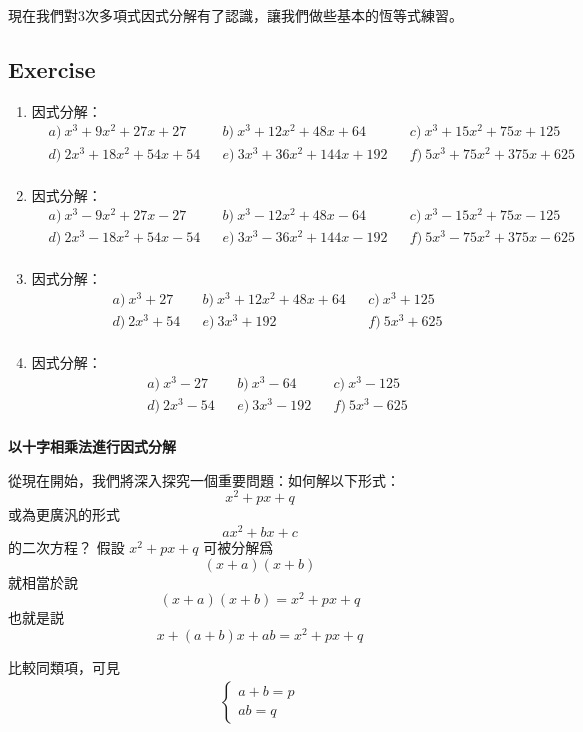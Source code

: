 \documentclass[12pt]{article}
\begin{document}
    現在我們對3次多項式因式分解有了認識，讓我們做些基本的恆等式練習。

    \subsection*{Exercise}
    \begin{enumerate}
        \item 因式分解：\begin{align*}
            &a)\ x^3+9x^2+27x+27&&b)\ x^3+12x^2+48x+64&&c)\ x^3+15x^2+75x+125\\
            &d)\ 2x^3+18x^2+54x+54&&e)\ 3x^3+36x^2+144x+192&&f)\ 5x^3+75x^2+375x+625\\
        \end{align*}
        \item 因式分解：\begin{align*}
            &a)\ x^3-9x^2+27x-27&&b)\ x^3-12x^2+48x-64&&c)\ x^3-15x^2+75x-125\\
            &d)\ 2x^3-18x^2+54x-54&&e)\ 3x^3-36x^2+144x-192&&f)\ 5x^3-75x^2+375x-625\\
        \end{align*}
        \item 因式分解：\begin{align*}
            &a)\ x^3+27&&b)\ x^3+12x^2+48x+64&&c)\ x^3+125\\
            &d)\ 2x^3+54&&e)\ 3x^3+192&&f)\ 5x^3+625\\
        \end{align*}
        \item 因式分解：\begin{align*}
            &a)\ x^3-27&&b)\ x^3-64&&c)\ x^3-125\\
            &d)\ 2x^3-54&&e)\ 3x^3-192&&f)\ 5x^3-625\\
        \end{align*}
    \end{enumerate}

    \begin{center}
        \textbf{以十字相乘法進行因式分解}
    \end{center}

    從現在開始，我們將深入探究一個重要問題：如何解以下形式： $$x^2+px+q$$ 或為更廣汎的形式 $$ax^2+bx+c$$ 的二次方程？ 假設 $x^2+px+q$ 可被分解爲 $$(x+a)(x+b)$$ 就相當於說 $$(x+a)(x+b)=x^2+px+q$$ 也就是説 $$x+(a+b)x+ab=x^2+px+q$$

    比較同類項，可見 \begin{align*}
        \begin{cases}
            a+b=p\\
            ab=q
        \end{cases}
    \end{align*}
\end{document}
